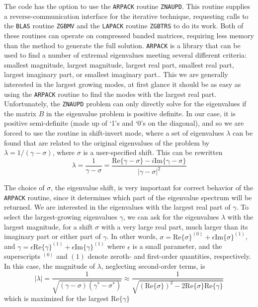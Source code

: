 \documentclass[letterpaper]{article}
\begin{document}
The code has the option to use the \texttt{ARPACK} routine
\texttt{ZNAUPD}. This routine supplies a reverse-communication interface
for the iterative technique, requesting calls to the \texttt{BLAS}
routine \texttt{ZGBMV} and the \texttt{LAPACK} routine \texttt{ZGBTRS} to do
its work. Both of these routines can operate on compressed banded
matrices, requiring less memory than the method to generate the full
solution. \texttt{ARPACK} is a library that can be used to find a number
of extremal eigenvalues meeting several different criteria: smallest
magnitude, largest magnitude, largest real part, smallest real part,
largest imaginary part, or smallest imaginary part.. This we are
generally interested in the largest growing modes, at first glance it
should be as easy as using the \texttt{ARPACK} routine to find the modes
with the largest real part. Unfortunately, the \texttt{ZNAUPD} problem
can only directly solve for the eigenvalues if the matrix $B$ in the
eigenvalue problem is positive definite. In our case, it is positive
semi-definite (made up of `1's and `0's on the diagonal), and so we
are forced to use the routine in shift-invert mode, where a set of
eigenvalues $\lambda$ can be found that are related to the original
eigenvalues of the problem by $\lambda = 1/(\gamma-\sigma)$, where
$\sigma$ is a user-specified shift. This can be rewritten
\begin{equation}
\lambda = \frac{1}{\gamma-\sigma} = \frac{\mathrm{Re}\{\gamma-\sigma\} 
                                          - i\mathrm{Im\{\gamma-\sigma\}}}
                                         {|\gamma-\sigma|^2}
\end{equation}

The choice of $\sigma$, the eigenvalue shift, is very important for
correct behavior of the \texttt{ARPACK} routine, since it determines
which part of the eigenvalue spectrum will be returned. We are
interested in the eigenvalues with the largest real part of $\gamma$.
To select the largest-growing eigenvalues $\gamma$, we can ask for the
eigenvalues $\lambda$ with the largest magnitude, for a shift $\sigma$
with a very large real part, much larger than its imaginary part or
either part of $\gamma$. In other words, $\sigma =
\mathrm{Re}\{\sigma\}^{(0)} + \epsilon\mathrm{Im}\{\sigma\}^{(1)}$,
and $\gamma = \epsilon\mathrm{Re}\{\gamma\}^{(1)} +
\epsilon\mathrm{Im}\{\gamma\}^{(1)}$ where $\epsilon$ is a small
parameter, and the superscripts $^{(0)}$ and ${(1)}$ denote zeroth-
and first-order quantities, respectively. In this case, the magnitude
of $\lambda$, neglecting second-order terms, is
\begin{equation}
|\lambda| = \frac{1}{\sqrt{\left(\gamma-\sigma\right)
                           \left(\gamma^*-\sigma^*\right)}}
\approx \frac{1}{\sqrt{\left(\mathrm{Re}\{\sigma\}\right)^2 
                       - 2\mathrm{Re}\{\sigma\}\mathrm{Re}\{\gamma\}}}
\end{equation}
which is maximized for the largest $\mathrm{Re}\{\gamma\}$
\end{document}
